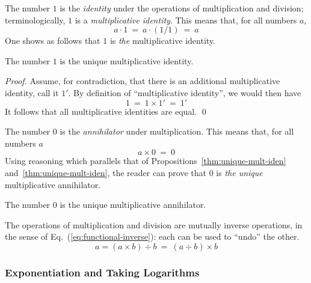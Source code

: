 \medskip

 

The number $1$ is the {\it identity} under the operations of multiplication and division; terminologically, $1$ is a {\it multiplicative identity}.  This means that, for all numbers $a$,
\[ a \cdot 1 \ = \ a \cdot (1/1) \ = \ a \]
One shows as follows that $1$ is {\em the} multiplicative identity.

\begin{prop}
\label{thm:unique-mult-iden}
The number $1$ is the unique multiplicative identity.
\end{prop}

\begin{proof}
Assume, for contradiction, that there is an additional multiplicative identity, call it $1'$.  By definition of ``multiplicative identity'', we would then have
\[ 1 \ = \ 1 \times 1' \ = \ 1' \]
It follows that all multiplicative identities are equal.  \qed
\end{proof}

\medskip


The number $0$ is the {\it annihilator} under multiplication.  This means that, for all numbers $a$
\[ a \times 0 \ = \ 0 \]
Using reasoning which parallels that of Propositions~\ref{thm:unique-mult-iden} and~\ref{thm:unique-mult-iden}, the reader can prove that $0$ is {\em the unique} multiplicative annihilator.

\begin{prop}
The number $0$ is the unique multiplicative annihilator.
\end{prop}

\medskip


The operations of multiplication and division are mutually inverse operations, in the sense of Eq.~(\ref{eq:functional-inverse}): each can be used to ``undo'' the other.
\[ a = (a \times b) \div b \ = \ (a \div b) \times b  \]

\subsubsection{Exponentiation and Taking Logarithms}
\label{sec:exponentiation}

